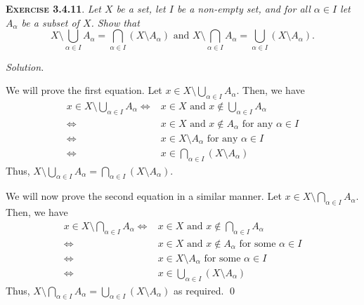 \documentclass[12pt]{article}
\theoremstyle{remark}
\newenvironment{exer}[2]{
    \noindent \setlength{\parskip}{1em}%
    \textsc{\textbf{Exercise #1}}. \textit{#2} \par
    \noindent \textit{Solution.} %
}{\bigskip}
\begin{document}
\begin{exer}{3.4.11}{
    Let $X$ be a set, let $I$ be a non-empty set, and for all $\alpha \in I$ let $A_\alpha$ be a subset of $X$.
    Show that
    \[
        X \setminus\bigcup_{\alpha \in I} A_\alpha = \bigcap_{\alpha \in I}(X \setminus A_\alpha)
    \text{ and }
        X \setminus\bigcap_{\alpha \in I} A_\alpha = \bigcup_{\alpha \in I}(X \setminus A_\alpha).
    \]
}
    We will prove the first equation.
    Let $x \in X \setminus \bigcup_{\alpha \in I} A_\alpha$.
    Then, we have
    \begin{align*}
             x \in X \setminus \bigcup_{\alpha \in I} A_\alpha
        \iff & x \in X \text{ and } x \notin \bigcup_{\alpha \in I} A_\alpha \\
        \iff & x \in X \text{ and } x \notin A_\alpha \text{ for any } \alpha \in I  \\
        \iff & x \in X \setminus A_\alpha \text{ for any } \alpha \in I  \\
        \iff & x \in \bigcap_{\alpha \in I} (X \setminus A_\alpha)
    \end{align*}
    Thus, $X \setminus\bigcup_{\alpha \in I} A_\alpha = \bigcap_{\alpha \in I}(X \setminus A_\alpha)$.

    We will now prove the second equation in a similar manner.
    Let $x \in X \setminus \bigcap_{\alpha \in I} A_\alpha$.
    Then, we have
    \begin{align*}
             x \in X \setminus \bigcap_{\alpha \in I} A_\alpha
        \iff & x \in X \text{ and } x \notin \bigcap_{\alpha \in I} A_\alpha  \\
        \iff & x \in X \text{ and } x \notin A_\alpha \text{ for some } \alpha \in I  \\
        \iff & x \in X \setminus A_\alpha \text{ for some } \alpha \in I  \\
        \iff & x \in \bigcup_{\alpha \in I} (X \setminus A_\alpha)
    \end{align*}
    Thus, $X \setminus\bigcap_{\alpha \in I} A_\alpha = \bigcup_{\alpha \in I}(X \setminus A_\alpha)$ as required. \qed
\end{exer}
\end{document}
